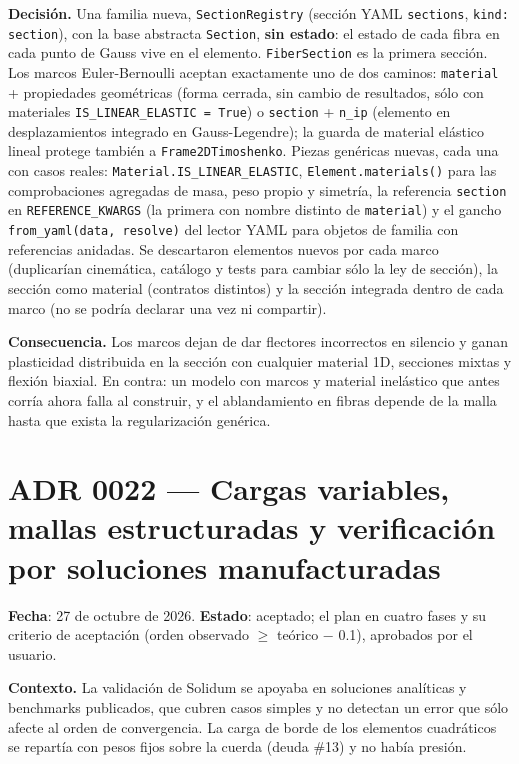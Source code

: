 \documentclass[11pt,oneside]{report}
\begin{document}
\textbf{Decisión.} Una familia nueva, \texttt{SectionRegistry} (sección YAML \texttt{sections}, \texttt{kind: section}), con la base abstracta \texttt{Section}, \textbf{sin estado}: el estado de cada fibra en cada punto de Gauss vive en el elemento. \texttt{FiberSection} es la primera sección. Los marcos Euler-Bernoulli aceptan exactamente uno de dos caminos: \texttt{material} + propiedades geométricas (forma cerrada, sin cambio de resultados, sólo con materiales \texttt{IS\_\allowbreak{}LINEAR\_\allowbreak{}ELASTIC = True}) o \texttt{section} + \texttt{n\_ip} (elemento en desplazamientos integrado en Gauss-Legendre); la guarda de material elástico lineal protege también a \texttt{Frame2DTimoshenko}. Piezas genéricas nuevas, cada una con casos reales: \texttt{Material.\allowbreak{}IS\_\allowbreak{}LINEAR\_\allowbreak{}ELASTIC}, \texttt{Element.\allowbreak{}materials()} para las comprobaciones agregadas de masa, peso propio y simetría, la referencia \texttt{section} en \texttt{REFERENCE\_KWARGS} (la primera con nombre distinto de \texttt{material}) y el gancho \texttt{from\_\allowbreak{}yaml(data, resolve)} del lector YAML para objetos de familia con referencias anidadas. Se descartaron elementos nuevos por cada marco (duplicarían cinemática, catálogo y tests para cambiar sólo la ley de sección), la sección como material (contratos distintos) y la sección integrada dentro de cada marco (no se podría declarar una vez ni compartir).

\textbf{Consecuencia.} Los marcos dejan de dar flectores incorrectos en silencio y ganan plasticidad distribuida en la sección con cualquier material 1D, secciones mixtas y flexión biaxial. En contra: un modelo con marcos y material inelástico que antes corría ahora falla al construir, y el ablandamiento en fibras depende de la malla hasta que exista la regularización genérica.

\section{ADR 0022 --- Cargas variables, mallas estructuradas y verificación por soluciones manufacturadas}
\label{adr:0022}

\textbf{Fecha}: 27 de octubre de 2026. \textbf{Estado}: aceptado; el plan en cuatro fases y su criterio de aceptación (orden observado \ensuremath{\ge} teórico − 0.1), aprobados por el usuario.

\textbf{Contexto.} La validación de Solidum se apoyaba en soluciones analíticas y benchmarks publicados, que cubren casos simples y no detectan un error que sólo afecte al orden de convergencia. La carga de borde de los elementos cuadráticos se repartía con pesos fijos sobre la cuerda (deuda \#13) y no había presión.
\end{document}
